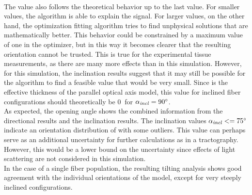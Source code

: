\\
% 
The \trel{} value also follows the theoretical behavior up to the last value.
For smaller \trel{} values, the algorithm is able to explain the signal.
For larger \trel{} values, on the other hand, the optimization fitting algorithm tries to find unphysical solutions that are mathematically better.
This behavior could be constrained by a maximum \trel{} value of one in the optimizer, but in this way it becomes clearer that the resulting orientation cannot be trusted.
This is true for the experimental tissue measurements, as there are many more effects than in this simulation.
However, for this simulation, the inclination results suggest that it may still be possible for the algorithm to find a feasible \trel{} value that would be very small.
Since \trel{} is the effective thickness of the parallel optical axis model, this value for inclined fiber configurations should theoretically be $\SI{0}{}$ for $\textnormal{$\alpha_{\mathit{incl}}$}=\SI{90}{\degree}$.
\\
% 
As expected, the opening angle shows the combined information from the directional results and the inclination results.
The inclination values $\textnormal{$\alpha_{\mathit{incl}}$} <= \SI{75}{\degree}$ indicate an orientation distribution of \dummy{} with some outliers.
This value can perhaps serve as an additional uncertainty for further calculations as in a tractography.
However, this would be a lower bound on the uncertainty since effects of light scattering are not considered in this simulation.
\\
% 
In the case of a single fiber population, the resulting tilting analysis shows good agreement with the individual orientations of the model, except for very steeply inclined configurations.
% 
